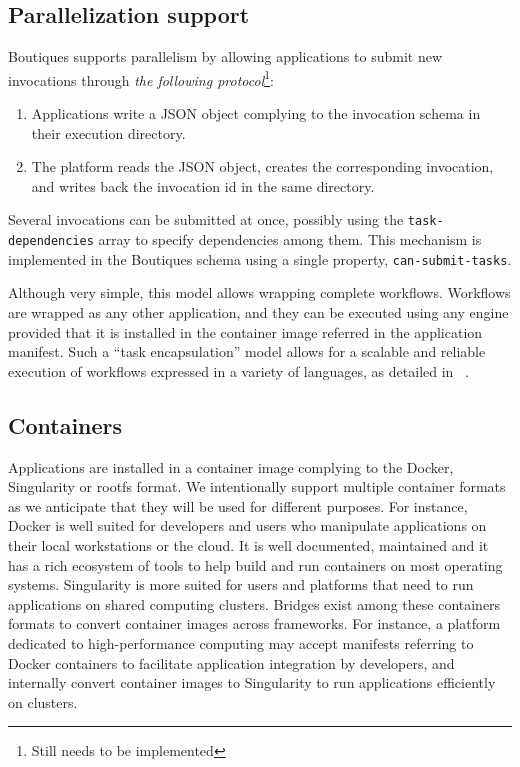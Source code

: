 \documentclass{article}
\newcommand{\boutiques}{Boutiques\xspace}
\newcommand{\notimplementedyet}[1]{\color{blue}\emph{#1}\footnote{Still needs to be implemented}\color{black}\xspace}
\begin{document}
\subsection{Parallelization support}
\label{sec:parallelization}
\boutiques supports parallelism by allowing applications to submit new
invocations through \notimplementedyet{the following protocol}:
\begin{enumerate}
\item Applications write a JSON object complying to the invocation
  schema in their execution directory.
\item The platform reads the JSON object, creates the corresponding
  invocation, and writes back the invocation id in the same directory.
\end{enumerate}
Several invocations can be submitted at once, possibly using the
\texttt{task-dependencies} array to specify dependencies among
them. This mechanism is implemented in the Boutiques schema using a
single property, \texttt{can-submit-tasks}.

Although very simple, this model allows wrapping complete
workflows. Workflows are wrapped as any other application, and they
can be executed using any engine provided that it is installed in the
container image referred in the application manifest. Such a ``task
encapsulation'' model allows for a scalable and reliable execution of
workflows expressed in a variety of languages, as detailed in
~\cite{glatard2016fgcs}.

\subsection{Containers}

Applications are installed in a container image complying to the
Docker, Singularity or rootfs format. We intentionally support
multiple container formats as we anticipate that they will be used for
different purposes. For instance, Docker is well suited for developers
and users who manipulate applications on their local workstations or the
cloud. It is well documented, maintained and it has a rich ecosystem of
tools to help build and run containers on most operating systems. Singularity
is more suited for users and platforms that need to run applications
on shared computing clusters. Bridges exist among these containers
formats to convert container images across frameworks. For instance, a
platform dedicated to high-performance computing may accept manifests
referring to Docker containers to facilitate application integration
by developers, and internally convert container images to Singularity
to run applications efficiently on clusters.
\end{document}
